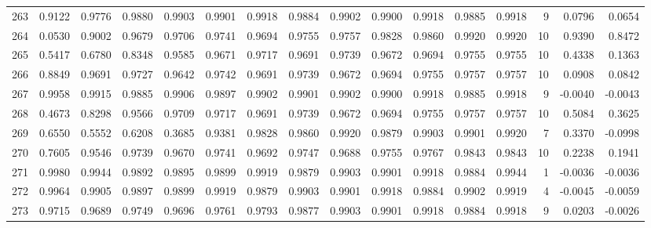 \begin{tabular}{lrrrrrrrrrrrrrrr}
263 &      0.9122 &  0.9776 &  0.9880 &  0.9903 &  0.9901 &  0.9918 &  0.9884 &  0.9902 &  0.9900 &  0.9918 &   0.9885 &     0.9918 &      9 &                    0.0796 &                     0.0654 \\
264 &      0.0530 &  0.9002 &  0.9679 &  0.9706 &  0.9741 &  0.9694 &  0.9755 &  0.9757 &  0.9828 &  0.9860 &   0.9920 &     0.9920 &     10 &                    0.9390 &                     0.8472 \\
265 &      0.5417 &  0.6780 &  0.8348 &  0.9585 &  0.9671 &  0.9717 &  0.9691 &  0.9739 &  0.9672 &  0.9694 &   0.9755 &     0.9755 &     10 &                    0.4338 &                     0.1363 \\
266 &      0.8849 &  0.9691 &  0.9727 &  0.9642 &  0.9742 &  0.9691 &  0.9739 &  0.9672 &  0.9694 &  0.9755 &   0.9757 &     0.9757 &     10 &                    0.0908 &                     0.0842 \\
267 &      0.9958 &  0.9915 &  0.9885 &  0.9906 &  0.9897 &  0.9902 &  0.9901 &  0.9902 &  0.9900 &  0.9918 &   0.9885 &     0.9918 &      9 &                   -0.0040 &                    -0.0043 \\
268 &      0.4673 &  0.8298 &  0.9566 &  0.9709 &  0.9717 &  0.9691 &  0.9739 &  0.9672 &  0.9694 &  0.9755 &   0.9757 &     0.9757 &     10 &                    0.5084 &                     0.3625 \\
269 &      0.6550 &  0.5552 &  0.6208 &  0.3685 &  0.9381 &  0.9828 &  0.9860 &  0.9920 &  0.9879 &  0.9903 &   0.9901 &     0.9920 &      7 &                    0.3370 &                    -0.0998 \\
270 &      0.7605 &  0.9546 &  0.9739 &  0.9670 &  0.9741 &  0.9692 &  0.9747 &  0.9688 &  0.9755 &  0.9767 &   0.9843 &     0.9843 &     10 &                    0.2238 &                     0.1941 \\
271 &      0.9980 &  0.9944 &  0.9892 &  0.9895 &  0.9899 &  0.9919 &  0.9879 &  0.9903 &  0.9901 &  0.9918 &   0.9884 &     0.9944 &      1 &                   -0.0036 &                    -0.0036 \\
272 &      0.9964 &  0.9905 &  0.9897 &  0.9899 &  0.9919 &  0.9879 &  0.9903 &  0.9901 &  0.9918 &  0.9884 &   0.9902 &     0.9919 &      4 &                   -0.0045 &                    -0.0059 \\
273 &      0.9715 &  0.9689 &  0.9749 &  0.9696 &  0.9761 &  0.9793 &  0.9877 &  0.9903 &  0.9901 &  0.9918 &   0.9884 &     0.9918 &      9 &                    0.0203 &                    -0.0026 \\

\end{tabular}
